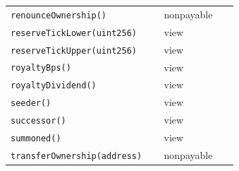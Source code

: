 \begin{longtable}{@{}p{0.62\linewidth}p{0.30\linewidth}@{}}
\texttt{\scriptsize renounceOwnership()} & nonpayable \\
\texttt{\scriptsize reserveTickLower(uint256)} & view \\
\texttt{\scriptsize reserveTickUpper(uint256)} & view \\
\texttt{\scriptsize royaltyBps()} & view \\
\texttt{\scriptsize royaltyDividend()} & view \\
\texttt{\scriptsize seeder()} & view \\
\texttt{\scriptsize successor()} & view \\
\texttt{\scriptsize summoned()} & view \\
\texttt{\scriptsize transferOwnership(address)} & nonpayable \\
\bottomrule\end{longtable}

